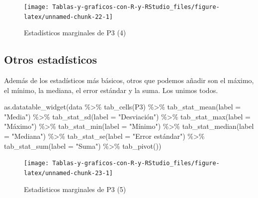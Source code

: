 \documentclass[
]{book}
\newenvironment{Shaded}{\begin{snugshade}}{\end{snugshade}}
\newcommand{\AttributeTok}[1]{\textcolor[rgb]{0.77,0.63,0.00}{#1}}
\newcommand{\FunctionTok}[1]{\textcolor[rgb]{0.00,0.00,0.00}{#1}}
\newcommand{\NormalTok}[1]{#1}
\newcommand{\SpecialCharTok}[1]{\textcolor[rgb]{0.00,0.00,0.00}{#1}}
\newcommand{\StringTok}[1]{\textcolor[rgb]{0.31,0.60,0.02}{#1}}
\begin{document}
\begin{figure}[H]

{\centering \texttt{[image: Tablas-y-graficos-con-R-y-RStudio\_files/figure-latex/unnamed-chunk-22-1]} 

}

\caption{Estadísticos marginales de P3 (4)}\label{fig:unnamed-chunk-22}
\end{figure}

\hypertarget{otros-estaduxedsticos}{%
\subsection{Otros estadísticos}\label{otros-estaduxedsticos}}

Además de los estadísticos más básicos, otros que podemos añadir son el máximo, el mínimo, la mediana, el error estándar y la suma. Los unimos todos.

\begin{Shaded}
\begin{Highlighting}[]
\FunctionTok{as.datatable\_widget}\NormalTok{(data }\SpecialCharTok{\%\textgreater{}\%}
  \FunctionTok{tab\_cells}\NormalTok{(P3) }\SpecialCharTok{\%\textgreater{}\%}
  \FunctionTok{tab\_stat\_mean}\NormalTok{(}\AttributeTok{label =} \StringTok{"Media"}\NormalTok{) }\SpecialCharTok{\%\textgreater{}\%}
  \FunctionTok{tab\_stat\_sd}\NormalTok{(}\AttributeTok{label =} \StringTok{"Desviación"}\NormalTok{) }\SpecialCharTok{\%\textgreater{}\%}
  \FunctionTok{tab\_stat\_max}\NormalTok{(}\AttributeTok{label =} \StringTok{"Máximo"}\NormalTok{) }\SpecialCharTok{\%\textgreater{}\%}
  \FunctionTok{tab\_stat\_min}\NormalTok{(}\AttributeTok{label =} \StringTok{"Mínimo"}\NormalTok{) }\SpecialCharTok{\%\textgreater{}\%}
  \FunctionTok{tab\_stat\_median}\NormalTok{(}\AttributeTok{label =} \StringTok{"Mediana"}\NormalTok{) }\SpecialCharTok{\%\textgreater{}\%}
  \FunctionTok{tab\_stat\_se}\NormalTok{(}\AttributeTok{label =} \StringTok{"Error estándar"}\NormalTok{) }\SpecialCharTok{\%\textgreater{}\%}
  \FunctionTok{tab\_stat\_sum}\NormalTok{(}\AttributeTok{label =} \StringTok{"Suma"}\NormalTok{) }\SpecialCharTok{\%\textgreater{}\%}
  \FunctionTok{tab\_pivot}\NormalTok{())}
\end{Highlighting}
\end{Shaded}

\begin{figure}[H]

{\centering \texttt{[image: Tablas-y-graficos-con-R-y-RStudio\_files/figure-latex/unnamed-chunk-23-1]} 

}

\caption{Estadísticos marginales de P3 (5)}\label{fig:unnamed-chunk-23}
\end{figure}
\end{document}
